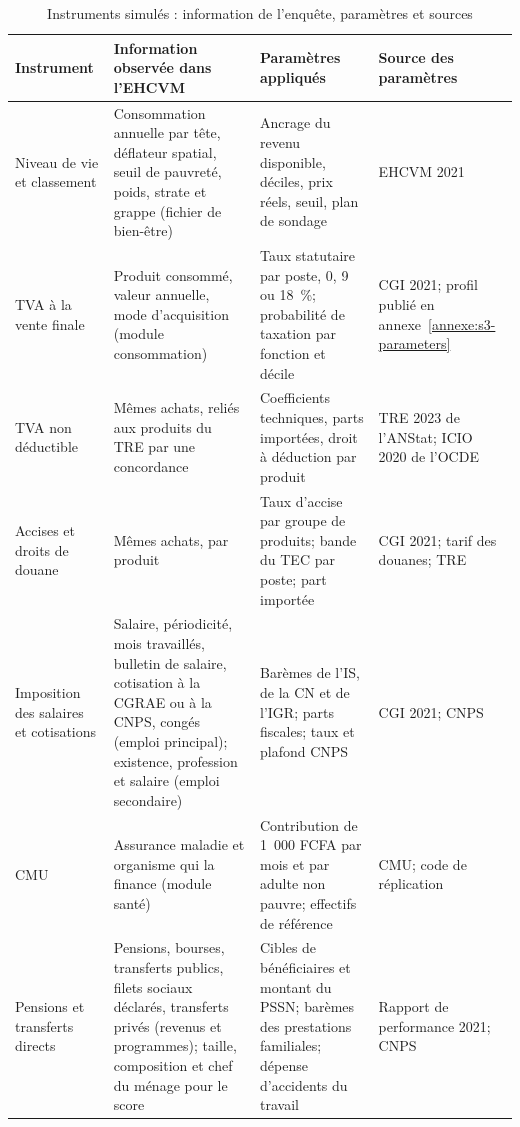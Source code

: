\documentclass[11pt,a4paper]{article}
\begin{document}
\begin{table}[tp]
\centering
\begin{threeparttable}
\caption{Instruments simulés : information de l'enquête, paramètres et sources}
\label{tab:variables-questionnaire}
\footnotesize
\begin{tabularx}{\textwidth}{>{\raggedright\arraybackslash}p{2.4cm}
  >{\raggedright\arraybackslash}X >{\raggedright\arraybackslash}X
  >{\raggedright\arraybackslash}p{2.9cm}}
\toprule
Instrument & Information observée dans l'EHCVM & Paramètres appliqués &
Source des paramètres \\
\midrule
Niveau de vie et classement & Consommation annuelle par tête, déflateur
spatial, seuil de pauvreté, poids, strate et grappe (fichier de bien-être) &
Ancrage du revenu disponible, déciles, prix réels, seuil, plan de sondage &
EHCVM 2021 \\
TVA à la vente finale & Produit consommé, valeur annuelle, mode d'acquisition
(module consommation) & Taux statutaire par poste, 0, 9 ou 18~\%; probabilité
de taxation par fonction et décile & CGI 2021; profil publié en
annexe~\ref{annexe:s3-parameters} \\
TVA non déductible & Mêmes achats, reliés aux produits du TRE par une
concordance & Coefficients techniques, parts importées, droit à déduction par
produit & TRE 2023 de l'ANStat; ICIO 2020 de l'OCDE \\
Accises et droits de douane & Mêmes achats, par produit & Taux d'accise par
groupe de produits; bande du TEC par poste; part importée & CGI 2021; tarif
des douanes; TRE \\
Imposition des salaires et cotisations & Salaire, périodicité, mois
travaillés, bulletin de salaire, cotisation à la CGRAE ou à la CNPS, congés
(emploi principal); existence, profession et salaire (emploi secondaire) &
Barèmes de l'IS, de la CN et de l'IGR; parts fiscales; taux et plafond CNPS &
CGI 2021; CNPS \\
CMU & Assurance maladie et organisme qui la finance (module santé) &
Contribution de 1~000 FCFA par mois et par adulte non pauvre; effectifs de
référence & CMU; code de réplication \\
Pensions et transferts directs & Pensions, bourses, transferts publics, filets
sociaux déclarés, transferts privés (revenus et programmes); taille,
composition et chef du ménage pour le score & Cibles de bénéficiaires et
montant du PSSN; barèmes des prestations familiales; dépense d'accidents du
travail & Rapport de performance 2021; CNPS \\

\end{tabularx}
\end{threeparttable}
\end{table}
\end{document}
